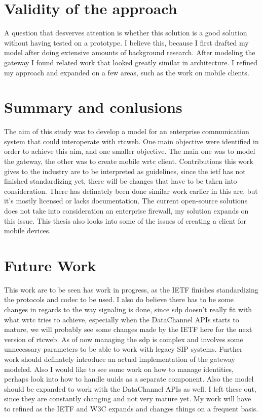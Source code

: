 \section{Validity of the approach}
A question that desverves attention is whether this solution is a good solution without having tested on a prototype. I believe this, because I first drafted my model after doing extensive amounts of background research. After modeling the gateway I found related work that looked greatly similar in architecture. I refined my approach and expanded on a few areas, such as the work on mobile clients.

\section{Summary and conlusions}
The aim of this study was to develop a model for an enterprise communication system that could interoperate with \gls{rtcweb}. One main objective were identified in order to achieve this aim, and one smaller objective. The main one was to model the gateway, the other was to create mobile \gls{wrtc} client. Contributions this work gives to the industry are to be interpreted as guidelines, since the \gls{ietf} has not finished standardizing yet, there will be changes that have to be taken into consideration. There has definately been done similar work earlier in this are, but it's mostly licensed or lacks documentation. The current open-source solutions does not take into consideration an enterprise firewall, my solution expands on this issue. This thesis also looks into some of the issues of creating a client for mobile devices.

\section{Future Work}
This work are to be seen has work in progress, as the IETF finishes standardizing the protocols and codec to be used. I also do believe there has to be some changes in regards to the way signaling is done, since \gls{sdp} doesn't really fit with what \gls{wrtc} tries to achieve, especially when the DataChannel APIs starts to mature, we will probably see some changes made by the IETF here for the next version of \gls{rtcweb}. As of now managing the \gls{sdp} is complex and involves some unnecessary parameters to be able to work with legacy SIP systems. Further work should definately introduce an actual implementation of the gateway modeled. Also I would like to see some work on how to manage identities, perhaps look into how to handle \gls{uuid}s as a separate component. Also the model should be expanded to work with the DataChannel APIs as well. I left these out, since they are constantly changing and not very mature yet. My work will have to refined as the IETF and W3C expands and changes things on a frequent basis.

